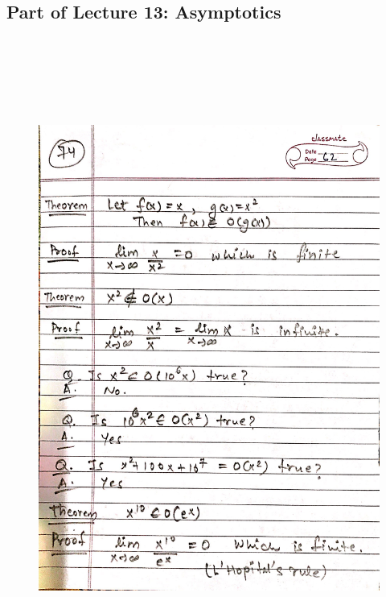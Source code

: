 \newpage
{\color{black} \subsection*{Part of Lecture 13: Asymptotics}}
\begin{figure}[H]
    \centering
    \includegraphics[width=16cm, height=21cm]{"./MIT-6.042J/MIT-6042J-074"}
\end{figure}

